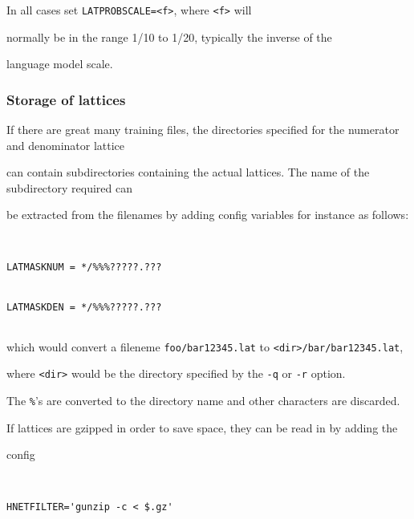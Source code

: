 In all cases set \texttt{LATPROBSCALE=<f>}, where \texttt{<f>} will


normally be in the range 1/10 to 1/20, typically the inverse of the


language model scale.











\subsubsection{Storage of lattices}





If there are great many training files, the directories specified for the numerator and denominator lattice


can contain subdirectories containing the actual lattices.  The name of the subdirectory required can


be extracted from the filenames by adding config variables for instance as follows:


\begin{verbatim}


LATMASKNUM = */%%%?????.???


LATMASKDEN = */%%%?????.???


\end{verbatim}


which would convert a fileneme \texttt{foo/bar12345.lat} to \texttt{<dir>/bar/bar12345.lat},


where \texttt{<dir>} would be the directory specified by the \texttt{-q} or \texttt{-r} option.


The \texttt{\%}'s are converted to the directory name and other characters are discarded.


If lattices are gzipped in order to save space, they can be read in by adding the 


config


\begin{verbatim}


HNETFILTER='gunzip -c < $.gz'


\end{verbatim}



















